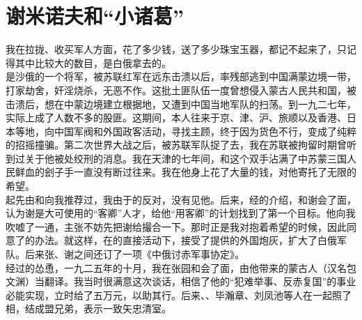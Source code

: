\fancyhead[RO]{} %
\fancyhead[LE]{} %
\chapter*{谢米诺夫和“小诸葛”}
\thispagestyle{empty}
我在拉拢、收买军人方面，花了多少钱，送了多少珠宝玉器，都记不起来了，只记得其中比较大的数目，是白俄拿去的。\\

是沙俄的一个将军，被苏联红军在远东击溃以后，率残部逃到中国满蒙边境一带，打家劫舍，奸淫烧杀，无恶不作。这批土匪队伍一度曾想侵入蒙古人民共和国，被击溃后，想在中蒙边境建立根据地，又遭到中国当地军队的扫荡。到一九二七年，实际上成了人数不多的股匪。这期间，本人往来于京、津、沪、旅顺以及香港、日本等地，向中国军阀和外国政客活动，寻找主顾，终于因为货色不行，变成了纯粹的招摇撞骗。第二次世界大战之后，被苏联军队捉了去，我在苏联被拘留时期曾听到过关于他被处绞刑的消息。我在天津的七年间，和这个双手沾满了中苏蒙三国人民鲜血的刽子手一直没有断过往来。我在他身上花了大量的钱，对他寄托了无限的希望。\\

起先由和向我推荐过，我由于的反对，没有见他。后来，经的介绍，和谢会了面，认为谢是大可使用的“客卿”人才，给他“用客卿”的计划找到了第一个目标。他向我吹嘘了一通，主张不妨先把谢给撮合一下。那时正是我对抱着希望的时候，因此同意了的办法。就这样，在的直接活动下，接受了提供的外国炮灰，扩大了白俄军队。后来张、谢之间还订了一项《中俄讨赤军事协定》。\\

经过的怂恿，一九二五年的十月，我在张园和会了面，由他带来的蒙古人（汉名包文渊）当翻译。我当时很满意这次谈话，相信了他的“犯难举事、反赤复国”的事业必能实现，立时给了五万元，以助其行。后来、、毕瀚章、刘凤池等人在一起照了相，结成盟兄弟，表示一致矢忠清室。\\

